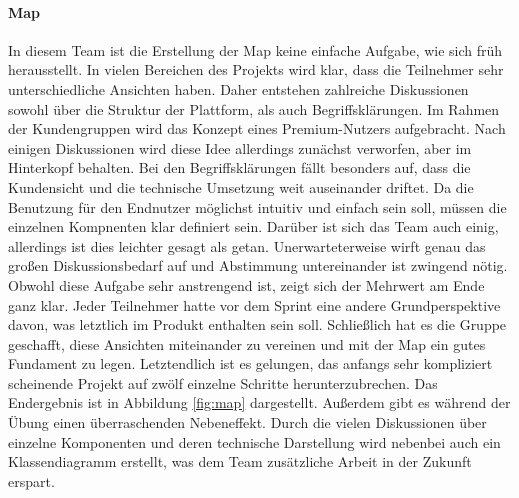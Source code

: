 \paragraph{Map}
In diesem Team ist die Erstellung der Map keine einfache Aufgabe, wie sich früh herausstellt. In vielen Bereichen des Projekts wird klar, dass die Teilnehmer sehr unterschiedliche Ansichten haben. Daher entstehen zahlreiche Diskussionen sowohl über die Struktur der Plattform, als auch Begriffsklärungen. Im Rahmen der Kundengruppen wird das Konzept eines Premium-Nutzers aufgebracht. Nach einigen Diskussionen wird diese Idee allerdings zunächst verworfen, aber im Hinterkopf behalten. Bei den Begriffsklärungen fällt besonders auf, dass die Kundensicht und die technische Umsetzung weit auseinander driftet. Da die Benutzung für den Endnutzer möglichst intuitiv und einfach sein soll, müssen die einzelnen Kompnenten klar definiert sein. Darüber ist sich das Team auch einig, allerdings ist dies leichter gesagt als getan. Unerwarteterweise wirft genau das großen Diskussionsbedarf auf und Abstimmung untereinander ist zwingend nötig. Obwohl diese Aufgabe sehr anstrengend ist, zeigt sich der Mehrwert am Ende ganz klar. Jeder Teilnehmer hatte vor dem Sprint eine andere Grundperspektive davon, was letztlich im Produkt enthalten sein soll. Schließlich hat es die Gruppe geschafft, diese Ansichten miteinander zu vereinen und mit der Map ein gutes Fundament zu legen. Letztendlich ist es gelungen, das anfangs sehr kompliziert scheinende Projekt auf zwölf einzelne Schritte herunterzubrechen. Das Endergebnis ist in Abbildung \ref{fig:map} dargestellt. Außerdem gibt es während der Übung einen überraschenden Nebeneffekt. Durch die vielen Diskussionen über einzelne Komponenten und deren technische Darstellung wird nebenbei auch ein Klassendiagramm erstellt, was dem Team zusätzliche Arbeit in der Zukunft erspart.


